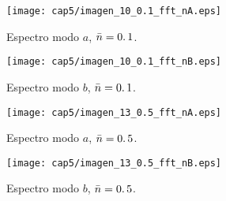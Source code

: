 \begin{figure}[ht]
\hspace*{-1.6cm}
\begin{minipage}{0.52 \linewidth}
\centering
 \texttt{[image: cap5/imagen\_10\_0.1\_fft\_nA.eps]}
\caption{Espectro modo $a$, $\bar{n}=0\ldotp 1$.}\label{fig:espectro_10_01}
\end{minipage}
\hspace*{1.5cm}
\begin{minipage}{0.52 \linewidth}
\centering
 \texttt{[image: cap5/imagen\_10\_0.1\_fft\_nB.eps]}
\caption{Espectro modo $b$, $\bar{n}=0\ldotp 1$.}\label{fig:espectro_10_01}
\end{minipage}
\end{figure}
\clearpage
\begin{figure}[h]
\hspace*{-1.6cm}
\begin{minipage}{0.52 \linewidth}
\centering
 \texttt{[image: cap5/imagen\_13\_0.5\_fft\_nA.eps]}
\caption{Espectro modo $a$, $\bar{n}=0\ldotp 5$.}\label{fig:espectro_13_05}
\end{minipage}
\hspace*{1.5cm}
\begin{minipage}{0.52 \linewidth}
\centering
 \texttt{[image: cap5/imagen\_13\_0.5\_fft\_nB.eps]}
\caption{Espectro modo $b$, $\bar{n}=0\ldotp 5$.}\label{fig:espectro_13_05}
\end{minipage}
\end{figure}

